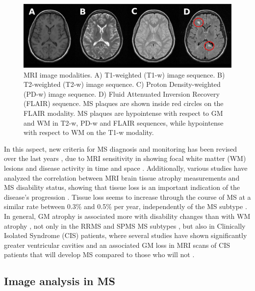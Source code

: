 \begin{figure}[top]
  \begin{center}
    \includegraphics[width=1\textwidth]{figures/figure_1.eps}
  \end{center}
    \caption[MRI image modalities]{MRI image modalities. A) T1-weighted (T1-w) image sequence. B) T2-weighted (T2-w) image sequence. C) Proton Density-weighted (PD-w) image sequence. D) Fluid Attenuated Inversion Recovery (FLAIR) sequence. MS plaques are shown inside red circles on the FLAIR modality. MS plaques are hypointense with respect to GM and WM in T2-w, PD-w and FLAIR sequences, while hypointense with respect to WM on the T1-w modality.}
    \label{mri_modalities}
\end{figure}

In this aspect, new criteria for MS diagnosis and monitoring has been revised over the last years \cite{Polman2011}, due to MRI sensitivity in showing focal white matter (WM) lesions and disease activity in time and space \cite{Filippi2011}. Additionally, various studies have analyzed the correlation between MRI brain tissue atrophy measurements and MS disability status, showing that tissue loss is an important indication of the disease's progression \cite{Chard2002, Filippi2013, Fisher2008, Rudick2009}. Tissue loss seems to increase through the course of MS at a similar rate between 0.3\% and 0.5\% per year, independently of the MS subtype \cite{DeStefano2010, Rudick2009}. In general, GM atrophy is associated more with disability changes than with WM atrophy \cite{Fisniku2008}, not only in the RRMS and SPMS MS subtypes \cite{Fisher2008, Rudick2009}, but also in Clinically Isolated Syndrome (CIS) patients, where several studies have shown significantly greater ventricular cavities and an associated GM loss in MRI scans of CIS patients that will develop MS compared to those who will not \cite{Ceccarelli2010,Filippi2013}.

\subsection{Image analysis in MS}
\label{subsec:image_analysis}

